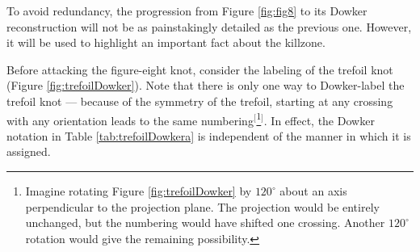 \documentclass[titlepage,11pt]{article}
\begin{document}
\noindent To avoid redundancy, the progression from Figure \ref{fig:fig8} to its Dowker reconstruction will not be as painstakingly detailed as the previous one. However, it will be used to highlight an important fact about the killzone.\par
Before attacking the figure-eight knot, consider the labeling of the trefoil knot (Figure \ref{fig:trefoilDowker}). Note that there is only one way to Dowker-label the trefoil knot --- because of the symmetry of the trefoil, starting at any crossing with any orientation leads to the same numbering$^[$\footnote{Imagine rotating Figure \ref{fig:trefoilDowker} by $120^\circ$ about an axis perpendicular to the projection plane. The projection would be entirely unchanged, but the numbering would have shifted one crossing. Another $120^\circ$ rotation would give the remaining possibility.}$^]$. In effect, the Dowker notation in Table \ref{tab:trefoilDowkera} is independent of the manner in which it is assigned.\par
\end{document}
